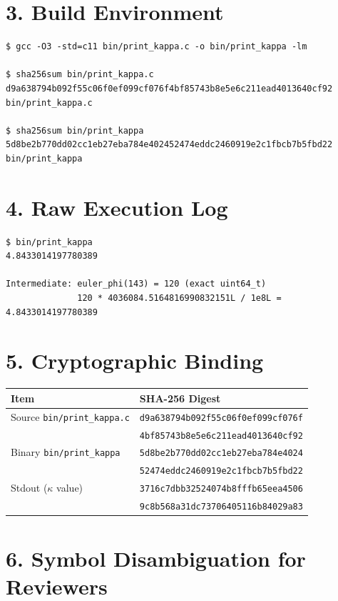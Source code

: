 \documentclass[11pt,letterpaper]{article}
\begin{document}
\section*{3. Build Environment}

\begin{lstlisting}
$ gcc -O3 -std=c11 bin/print_kappa.c -o bin/print_kappa -lm

$ sha256sum bin/print_kappa.c
d9a638794b092f55c06f0ef099cf076f4bf85743b8e5e6c211ead4013640cf92  bin/print_kappa.c

$ sha256sum bin/print_kappa
5d8be2b770dd02cc1eb27eba784e402452474eddc2460919e2c1fbcb7b5fbd22  bin/print_kappa
\end{lstlisting}

\section*{4. Raw Execution Log}

\begin{lstlisting}
$ bin/print_kappa
4.8433014197780389

Intermediate: euler_phi(143) = 120 (exact uint64_t)
              120 * 4036084.5164816990832151L / 1e8L = 4.8433014197780389
\end{lstlisting}

\section*{5. Cryptographic Binding}

\begin{center}
\begin{tabular}{|l|l|}
\hline
\textbf{Item} & \textbf{SHA-256 Digest} \\
\hline
Source \texttt{bin/print\_kappa.c} & \texttt{d9a638794b092f55c06f0ef099cf076f} \\
 & \texttt{4bf85743b8e5e6c211ead4013640cf92} \\
\hline
Binary \texttt{bin/print\_kappa} & \texttt{5d8be2b770dd02cc1eb27eba784e4024} \\
 & \texttt{52474eddc2460919e2c1fbcb7b5fbd22} \\
\hline
Stdout ($\kappa$ value) & \texttt{3716c7dbb32524074b8fffb65eea4506} \\
 & \texttt{9c8b568a31dc73706405116b84029a83} \\
\hline
\end{tabular}
\end{center}

\section*{6. Symbol Disambiguation for Reviewers}
\end{document}
